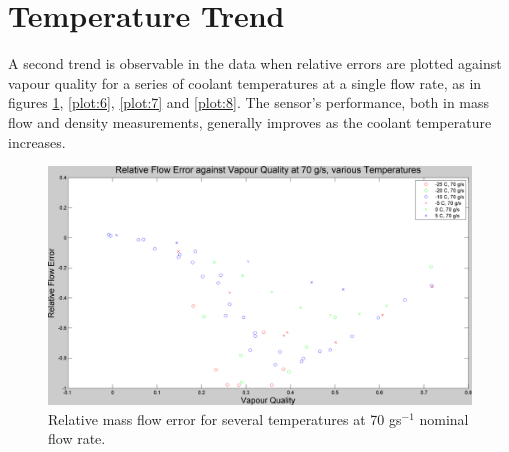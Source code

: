 \documentclass{report}
\begin{document}
\section{Temperature Trend}
A second trend is observable in the data when relative errors are plotted against vapour quality for a series of coolant temperatures at a single flow rate, as in figures \ref{plot:5}, \ref{plot:6}, \ref{plot:7} and \ref{plot:8}. The sensor's performance, both in mass flow and density measurements, generally improves as the coolant temperature increases.
\FloatBarrier
\begin{figure}
\includegraphics[width=\textwidth]{plots/fig5}
\caption{Relative mass flow error for several temperatures at 70 gs$^{-1}$ nominal flow rate.}
\label{plot:5}
\end{figure}
\end{document}
